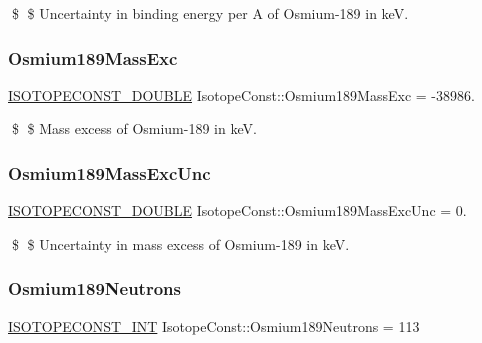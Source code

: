 \$ \$ Uncertainty in binding energy per A of Osmium-\/189 in keV. \mbox{\label{group___isotope_const-_osmium-_os189_gacff2108370c6807985de9f4b520b8c10}} 
\subsubsection{\texorpdfstring{Osmium189\+Mass\+Exc}{Osmium189MassExc}}
{\footnotesize\ttfamily \mbox{\hyperlink{group___isotope_const-_macros_ga8f45a7272ce02c0b4c65c44636ed719a}{I\+S\+O\+T\+O\+P\+E\+C\+O\+N\+S\+T\+\_\+\+D\+O\+U\+B\+LE}} Isotope\+Const\+::\+Osmium189\+Mass\+Exc = -\/38986.}

\$ \$ Mass excess of Osmium-\/189 in keV. \mbox{\label{group___isotope_const-_osmium-_os189_ga867b92e711ab05c77edcaca2c8161d0b}} 
\subsubsection{\texorpdfstring{Osmium189\+Mass\+Exc\+Unc}{Osmium189MassExcUnc}}
{\footnotesize\ttfamily \mbox{\hyperlink{group___isotope_const-_macros_ga8f45a7272ce02c0b4c65c44636ed719a}{I\+S\+O\+T\+O\+P\+E\+C\+O\+N\+S\+T\+\_\+\+D\+O\+U\+B\+LE}} Isotope\+Const\+::\+Osmium189\+Mass\+Exc\+Unc = 0.}

\$ \$ Uncertainty in mass excess of Osmium-\/189 in keV. \mbox{\label{group___isotope_const-_osmium-_os189_ga614f106c85c2f993f44752e0599b8a3b}} 
\subsubsection{\texorpdfstring{Osmium189\+Neutrons}{Osmium189Neutrons}}
{\footnotesize\ttfamily \mbox{\hyperlink{group___isotope_const-_macros_ga5f18360b3e99483a35c32d789e62621c}{I\+S\+O\+T\+O\+P\+E\+C\+O\+N\+S\+T\+\_\+\+I\+NT}} Isotope\+Const\+::\+Osmium189\+Neutrons = 113}

